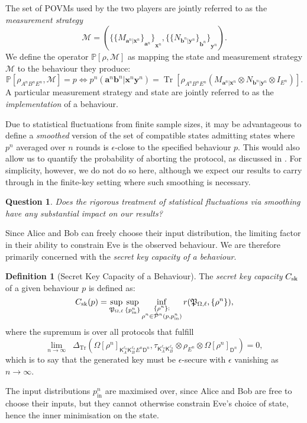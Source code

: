 \documentclass[10pt, a4paper]{article}
\numberwithin{equation}{section} %
\newcounter{stmt} %
\theoremstyle{definition}
\newtheorem{defn}[stmt]{Definition}
\theoremstyle{plain}
\newtheorem{question}{Question}
\newcommand{\?}{\mathrel{?}} %
\newcommand{\cvec}[1]{\boldsymbol{\mathbf{#1}}}    %
\newcommand{\Tr}[2][]{\mathop{\mathrm{Tr}#1}\left[ #2 \right]} %
\newcommand{\Trdist}[2]{\mathop{}\Delta_\mathrm{Tr}\left(#1, #2\right)}
\newcommand{\sM}{\mathcal{M}}
\newcommand{\crv}[1]{\mathsf{#1}}
\newcommand{\compatstates}[3][]{\hat{\mathcal{P}}#1(#2,#3)}
\newcommand{\proto}[2][_{\Omega,\ell}]{\mathfrak{#2}#1}
\newcommand{\prin}[1][p]{#1_{\mathrm{in}}}
\newcommand{\behav}[2]{\mathbb{P}\left[#1, #2\right]}
\newcommand{\sk}{\rm sk}
\begin{document}
    The set of POVMs used by the two players are jointly referred to as the \emph{measurement strategy}
    \[ \sM = \left( {\{ {\{ M_{\cvec{a}^n|\cvec{x}^n}\}}_{\cvec{a}^n} \}}_{\cvec{x}^n}, {\{ {\{ N_{\cvec{b}^n|\cvec{y}^n}\}}_{\cvec{b}^n} \}}_{\cvec{y}^n} \right). \]
    We define the operator \(\behav{\rho}{\sM}\) as mapping the state and measurement strategy \(\sM\) to the behaviour they produce:
    \begin{equation}
      \behav{\rho_{A^n B^n E^n}}{\sM} = p \Leftrightarrow p^n(\cvec{a}^n\cvec{b}^n|\cvec{x}^n\cvec{y}^n) = \Tr{\rho_{A^n B^n E^n} \left(M_{\cvec{a}^n|\cvec{x}^n} \otimes N_{\cvec{b}^n|\cvec{y}^n} \otimes I_{E^n}\right) }.
    \end{equation}
    A particular measurement strategy and state are jointly referred to as the \emph{implementation} of a behaviour.

    Due to statistical fluctuations from finite sample sizes, it may be advantageous to define a \emph{smoothed} version of the set of compatible states admitting states where \(p^n\) averaged over \(n\) rounds is \(\epsilon\)-close to the specified behaviour \(p\). This would also allow us to quantify the probability of aborting the protocol, as discussed in . For simplicity, however, we do not do so here, although we expect our results to carry through in the finite-key setting where such smoothing is necessary.
    \begin{question}
      Does the rigorous treatment of statistical fluctuations via smoothing have any substantial impact on our results?
    \end{question}

    Since Alice and Bob can freely choose their input distribution, the limiting factor in their ability to constrain Eve is the observed behaviour. We are therefore primarily concerned with the \emph{secret key capacity of a behaviour}.
    \begin{defn}[Secret Key Capacity of a Behaviour]\label{def:seckeycapbehav}
    The \emph{secret key capacity} \(C_{\sk}\) of a given behaviour \(p\) is defined as:
    \begin{equation}
    C_{\sk}(p) = \sup_{\proto{P}} \sup_{\{\prin^n\}} \inf_{\substack{\{\rho^{n}\} : \\ \rho^{n} \in \compatstates[^n]{p}{\prin^n}}} r(\proto{P}, \{\rho^{n}\}),
    \end{equation}
    where the supremum is over all protocols that fulfill
    \begin{equation}
    \lim_{n\to\infty} \Trdist{{\Omega[\rho^n]}_{\crv{K}_{A}^{\ell_n} \crv{K}_{B}^{\ell_n} E^n \crv{D}^n}}{\tau_{\crv{K}_{A}^{\ell_n} \crv{K}_{B}^{\ell_n}} \otimes \rho_{E^n} \otimes {\Omega[\rho^n]}_{\crv{D}^n}} = 0,
    \end{equation}
    which is to say that the generated key must be \(\epsilon\)-secure with \(\epsilon\) vanishing as \(n\to\infty\).
    \end{defn}
    The input distributions \(\prin^n\) are maximised over, since Alice and Bob are free to choose their inputs, but they cannot otherwise constrain Eve's choice of state, hence the inner minimisation on the state.
\end{document}
